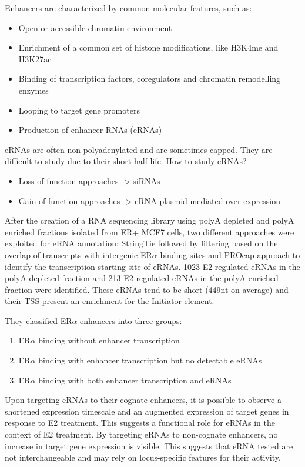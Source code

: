 Enhancers are characterized by common molecular features, such as: 

\begin{itemize}
\item Open or accessible chromatin environment 
\item Enrichment of a common set of histone modifications, like H3K4me and H3K27ac 
\item Binding of transcription factors, coregulators and chromatin remodelling enzymes 
\item Looping to target gene promoters  
\item Production of enhancer RNAs (eRNAs)
\end{itemize}

eRNAs are often non-polyadenylated and are sometimes capped.  They are difficult to study due to their short half-life. 
How to study eRNAs? 
\begin{itemize}
\item Loss of function approaches -> siRNAs 
\item Gain of function approaches -> eRNA plasmid mediated over-expression
\end{itemize}

After the creation of a RNA sequencing library using polyA depleted and polyA enriched fractions
isolated from ER+ MCF7 cells, two different approaches were exploited for eRNA annotation: StringTie followed by filtering based on the overlap of transcripts with intergenic ER$\alpha$ binding sites and PROcap approach to identify the transcription starting site of eRNAs.
1023 E2-regulated eRNAs in the polyA-depleted fraction and 213 E2-regulated
eRNAs in the polyA-enriched fraction were identified.
These eRNAs tend to be short (449nt on average) and their TSS present an enrichment for the Initiator element.

They classified ER$\alpha$ enhancers into three groups:

\begin{enumerate}
\item ER$\alpha$ binding without enhancer transcription
\item ER$\alpha$ binding with enhancer transcription but
no detectable eRNAs
\item ER$\alpha$ binding with both enhancer transcription
and eRNAs
\end{enumerate}

Upon targeting eRNAs to their cognate
enhancers, it is possible to observe a
shortened expression timescale and an
augmented expression of target genes in
response to E2 treatment.
This suggests a functional role for eRNAs in the context of E2 treatment.
By targeting eRNAs to non-cognate enhancers, no
increase in target gene expression is visible.
This suggests that eRNA tested are not
interchangeable and may rely on locus-specific features for their activity.

